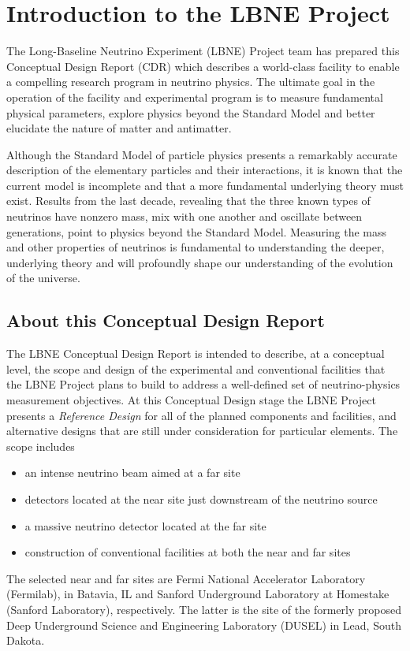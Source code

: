 

\section{Introduction to the LBNE Project}
\label{sec:intro-lbne-each-vol}

The Long-Baseline Neutrino Experiment (LBNE) Project team has prepared this Conceptual
Design Report (CDR) which describes a world-class facility to enable a compelling research program in neutrino physics. The ultimate goal in
the operation of the facility and experimental program is to measure fundamental physical
parameters, explore physics beyond the Standard Model and better elucidate the nature of matter
and antimatter. 

Although the Standard Model of particle physics presents a remarkably accurate
description of the elementary particles and their interactions, it is known that the current
model is incomplete and that a more fundamental underlying theory must exist. Results from the
last decade, revealing that the three known types of neutrinos have nonzero mass, mix with one
another and oscillate between generations, point to physics beyond the Standard Model.
Measuring the mass and other properties of neutrinos is fundamental to understanding the deeper,
underlying theory and will profoundly shape our understanding of the evolution of the universe.


\subsection{About this Conceptual Design Report}
The LBNE Conceptual Design Report is intended to describe, at a conceptual level, the scope and design of the experimental and conventional facilities that the LBNE Project plans to build to address a well-defined set of neutrino-physics measurement objectives.  At this Conceptual Design stage the LBNE Project presents a {\em Reference Design} for all of the planned components and facilities, and alternative designs that are still under consideration for particular elements. 
The scope includes 
\begin{itemize}
\item an intense neutrino beam aimed at a far site
\item detectors located at the near site just downstream of the neutrino source
\item a massive neutrino detector located at the far site
\item construction of conventional facilities at both the near and far sites
\end{itemize}
The selected near and far sites are Fermi National Accelerator Laboratory (Fermilab), in Batavia, IL and  Sanford Underground Laboratory at Homestake (Sanford Laboratory), respectively. The latter is the site of the formerly proposed Deep Underground Science and Engineering
Laboratory (DUSEL) in Lead, South Dakota.

